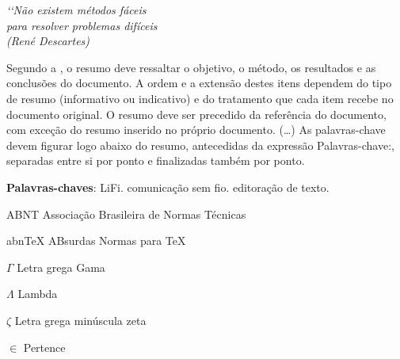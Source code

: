 \documentclass[
12pt,				%
openright,			%
twoside,			%
a4paper,			%
english,			%
french,				%
spanish,			%
brazil,				%
]{abntex2}
\begin{document}
	
	\begin{epigrafe}
		\vspace*{\fill}
		\begin{flushright}
			\textit{‘‘Não existem métodos fáceis \\
				para resolver problemas difíceis \\
				(René Descartes)}
		\end{flushright}
	\end{epigrafe}
	
	
	
	\setlength{\absparsep}{18pt} %
	\begin{resumo}
		Segundo a , o resumo deve ressaltar o
		objetivo, o método, os resultados e as conclusões do documento. A ordem e a extensão
		destes itens dependem do tipo de resumo (informativo ou indicativo) e do
		tratamento que cada item recebe no documento original. O resumo deve ser
		precedido da referência do documento, com exceção do resumo inserido no
		próprio documento. (\ldots) As palavras-chave devem figurar logo abaixo do
		resumo, antecedidas da expressão Palavras-chave:, separadas entre si por
		ponto e finalizadas também por ponto.
		
		\noindent
		\textbf{Palavras-chaves}: LiFi. comunicação sem fio. editoração de texto.
	\end{resumo}
	
	\listoffigures*
	\cleardoublepage
	
	\listoftables*
	\cleardoublepage
	
	\begin{siglas}
		\item[ABNT] Associação Brasileira de Normas Técnicas
		\item[abnTeX] ABsurdas Normas para TeX
	\end{siglas}
	
	\begin{simbolos}
		\item[$ \Gamma $] Letra grega Gama
		\item[$ \Lambda $] Lambda
		\item[$ \zeta $] Letra grega minúscula zeta
		\item[$ \in $] Pertence
	\end{simbolos}
	
\end{document}
